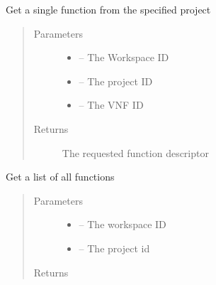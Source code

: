 \documentclass[letterpaper,10pt,english]{sphinxmanual}
\begin{document}
\begin{fulllineitems}
\label{_source/son_editor.impl:son_editor.impl.functionsimpl.get_function_project}
Get a single function from the specified project
\begin{quote}\begin{description}
\item[{Parameters}] \leavevmode\begin{itemize}
\item {} 
 -- The Workspace ID

\item {} 
 -- The project ID

\item {} 
 -- The VNF ID

\end{itemize}

\item[{Returns}] \leavevmode
The requested function descriptor

\end{description}\end{quote}

\end{fulllineitems}


\begin{fulllineitems}
\label{_source/son_editor.impl:son_editor.impl.functionsimpl.get_functions}
Get a list of all functions
\begin{quote}\begin{description}
\item[{Parameters}] \leavevmode\begin{itemize}
\item {} 
 -- The workspace ID

\item {} 
 -- The project id

\end{itemize}

\item[{Returns}] \leavevmode


\end{description}\end{quote}

\end{fulllineitems}
\end{document}
